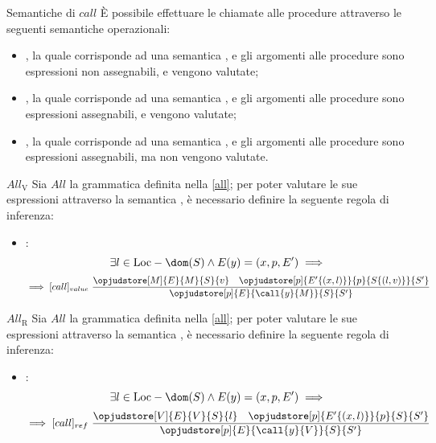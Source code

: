 \documentclass[a4paper, 12pt]{report}
\begin{document}
    \begin{frameddefn}{Semantiche di $call$}
        È possibile effettuare le chiamate alle procedure attraverso le seguenti semantiche operazionali:

        \begin{itemize}
            \item {}, la quale corrisponde ad una semantica , e gli argomenti alle procedure sono espressioni non assegnabili, e vengono valutate;
            \item {}, la quale corrisponde ad una semantica , e gli argomenti alle procedure sono espressioni assegnabili, e vengono valutate;
            \item {}, la quale corrisponde ad una semantica , e gli argomenti alle procedure sono espressioni assegnabili, ma non vengono valutate.
        \end{itemize}
    \end{frameddefn}

    \begin{framedprop}[label={all v}]{$All_\mathrm{V}$}
        Sia $All$ la grammatica definita nella \cref{all}; per poter valutare le sue espressioni attraverso la semantica , è necessario definire la seguente regola di inferenza:

        \begin{itemize}
            \item {}: $$\exists l \in \mathrm{Loc} - \dom(S) \land E(y) = (x, p, E') \implies$$ $$\implies [call]_{value} \ \dfrac{\opjudstore[M]{E}{M}{S}{v} \quad \opjudstore[p]{E'\{(x,l)\}}{p}{S\{(l,v)\}}{S'}}{\opjudstore[p]{E}{\call{y}{M}}{S}{S'}}$$
        \end{itemize}
    \end{framedprop}

    \begin{framedprop}[label={all r}]{$All_\mathrm{R}$}
        Sia $All$ la grammatica definita nella \cref{all}; per poter valutare le sue espressioni attraverso la semantica , è necessario definire la seguente regola di inferenza: 

        \begin{itemize}
            \item {}: $$\exists l \in \mathrm{Loc} - \dom(S) \land E(y) = (x, p, E') \implies$$ $$\implies [call]_{ref} \ \dfrac{\opjudstore[V]{E}{V}{S}{l} \quad \opjudstore[p]{E'\{(x,l)\}}{p}{S}{S'}}{\opjudstore[p]{E}{\call{y}{V}}{S}{S'}}$$
        \end{itemize}
    \end{framedprop}
\end{document}
